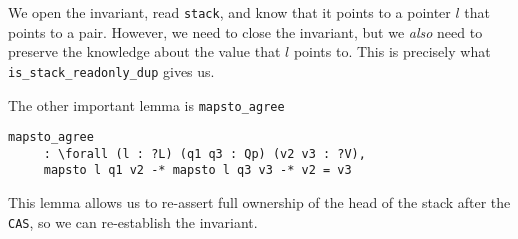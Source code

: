 \begin{itemize}
We open the invariant,  read \texttt{stack}, and know that it points to a pointer $l$ that points to a pair. However, we need to close the invariant, but we \emph{also} need to preserve the knowledge about the value that $l$ points to. This is precisely what \texttt{is\_stack\_readonly\_dup} gives us.

The other important lemma is \texttt{mapsto\_agree}
\begin{verbatim}
mapsto_agree
     : \forall (l : ?L) (q1 q3 : Qp) (v2 v3 : ?V),
     mapsto l q1 v2 -* mapsto l q3 v3 -* v2 = v3
\end{verbatim}

This lemma allows us to re-assert full ownership of the head of the stack after the \texttt{CAS}, so we can re-establish the invariant.

\end{itemize}